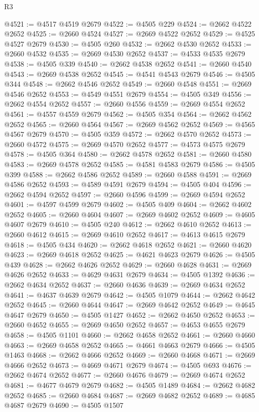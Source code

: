 \begin{lexlean}{R3}
\begin{coremodule}
@4521 := @4517 @4519 @2679
@4522 := @4505 @229
@4524 := @2662 @4522 @2652
@4525 := @2660 @4524
@4527 := @2669 @4522 @2652
@4529 := @4525 @4527 @2679
@4530 := @4505 @260
@4532 := @2662 @4530 @2652
@4533 := @2660 @4532
@4535 := @2669 @4530 @2652
@4537 := @4533 @4535 @2679
@4538 := @4505 @339
@4540 := @2662 @4538 @2652
@4541 := @2660 @4540
@4543 := @2669 @4538 @2652
@4545 := @4541 @4543 @2679
@4546 := @4505 @344
@4548 := @2662 @4546 @2652
@4549 := @2660 @4548
@4551 := @2669 @4546 @2652
@4553 := @4549 @4551 @2679
@4554 := @4505 @349
@4556 := @2662 @4554 @2652
@4557 := @2660 @4556
@4559 := @2669 @4554 @2652
@4561 := @4557 @4559 @2679
@4562 := @4505 @354
@4564 := @2662 @4562 @2652
@4565 := @2660 @4564
@4567 := @2669 @4562 @2652
@4569 := @4565 @4567 @2679
@4570 := @4505 @359
@4572 := @2662 @4570 @2652
@4573 := @2660 @4572
@4575 := @2669 @4570 @2652
@4577 := @4573 @4575 @2679
@4578 := @4505 @364
@4580 := @2662 @4578 @2652
@4581 := @2660 @4580
@4583 := @2669 @4578 @2652
@4585 := @4581 @4583 @2679
@4586 := @4505 @399
@4588 := @2662 @4586 @2652
@4589 := @2660 @4588
@4591 := @2669 @4586 @2652
@4593 := @4589 @4591 @2679
@4594 := @4505 @404
@4596 := @2662 @4594 @2652
@4597 := @2660 @4596
@4599 := @2669 @4594 @2652
@4601 := @4597 @4599 @2679
@4602 := @4505 @409
@4604 := @2662 @4602 @2652
@4605 := @2660 @4604
@4607 := @2669 @4602 @2652
@4609 := @4605 @4607 @2679
@4610 := @4505 @240
@4612 := @2662 @4610 @2652
@4613 := @2660 @4612
@4615 := @2669 @4610 @2652
@4617 := @4613 @4615 @2679
@4618 := @4505 @434
@4620 := @2662 @4618 @2652
@4621 := @2660 @4620
@4623 := @2669 @4618 @2652
@4625 := @4621 @4623 @2679
@4626 := @4505 @439
@4628 := @2662 @4626 @2652
@4629 := @2660 @4628
@4631 := @2669 @4626 @2652
@4633 := @4629 @4631 @2679
@4634 := @4505 @1392
@4636 := @2662 @4634 @2652
@4637 := @2660 @4636
@4639 := @2669 @4634 @2652
@4641 := @4637 @4639 @2679
@4642 := @4505 @1079
@4644 := @2662 @4642 @2652
@4645 := @2660 @4644
@4647 := @2669 @4642 @2652
@4649 := @4645 @4647 @2679
@4650 := @4505 @1427
@4652 := @2662 @4650 @2652
@4653 := @2660 @4652
@4655 := @2669 @4650 @2652
@4657 := @4653 @4655 @2679
@4658 := @4505 @1101
@4660 := @2662 @4658 @2652
@4661 := @2660 @4660
@4663 := @2669 @4658 @2652
@4665 := @4661 @4663 @2679
@4666 := @4505 @1463
@4668 := @2662 @4666 @2652
@4669 := @2660 @4668
@4671 := @2669 @4666 @2652
@4673 := @4669 @4671 @2679
@4674 := @4505 @693
@4676 := @2662 @4674 @2652
@4677 := @2660 @4676
@4679 := @2669 @4674 @2652
@4681 := @4677 @4679 @2679
@4682 := @4505 @1489
@4684 := @2662 @4682 @2652
@4685 := @2660 @4684
@4687 := @2669 @4682 @2652
@4689 := @4685 @4687 @2679
@4690 := @4505 @1507

\end{coremodule}
\end{lexlean}
